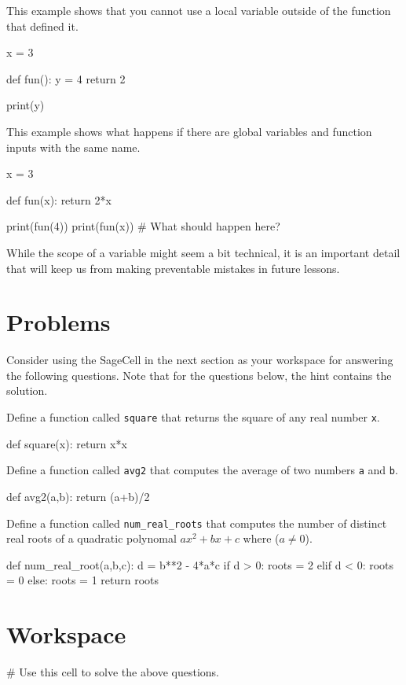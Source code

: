 \documentclass{ximera}
\begin{document}
This example shows that you cannot use a local variable outside of the function that defined it.

\begin{sageCell}
x = 3

def fun():
        y = 4
        return 2

print(y)
\end{sageCell}

This example shows what happens if there are global variables and function inputs with the same name.

\begin{sageCell}
x = 3

def fun(x):
	return 2*x

print(fun(4))
print(fun(x))     # What should happen here?
\end{sageCell}

While the scope of a variable might seem a bit technical, it is an important detail that will keep us from making preventable mistakes in future lessons.

\section{Problems}

Consider using the SageCell in the next section as your workspace for answering the following questions. Note that for the questions below, the hint contains the solution.

\begin{question}
	Define a function called \verb|square| that returns the square of any real number \verb|x|. 
	\begin{hint}
\begin{sageCell}
def square(x):
        return x*x
\end{sageCell}
	\end{hint}
\end{question}

\begin{question}
	Define a function called \verb|avg2| that computes the average of two numbers \verb|a| and \verb|b|.
	\begin{hint}
\begin{sageCell}
def avg2(a,b):
        return (a+b)/2
\end{sageCell}
	\end{hint}
\end{question}

\begin{question}
	Define a function called \verb|num_real_roots| that computes the number of distinct real roots of a quadratic polynomal $ax^2+bx+c$ where ($a\neq 0$).
	\begin{hint}
\begin{sageCell}
def num_real_root(a,b,c):
        d = b**2 - 4*a*c
	if d > 0:
                roots = 2
	elif d < 0:
                roots = 0
        else:
                roots = 1
        return roots
\end{sageCell}
	\end{hint}
\end{question}

\section{Workspace}

\begin{sageCell}
# Use this cell to solve the above questions.


\end{sageCell}
\end{document}
